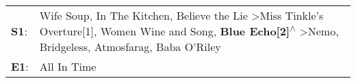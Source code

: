 \begin{supertabular}{p{0.03\textwidth}p{0.92\textwidth}}
 \textbf{S1}:  &  Wife Soup\textsuperscript{}, \enspace In The Kitchen\textsuperscript{}, \enspace Believe the Lie\textsuperscript{} \textgreater \enspace Miss Tinkle's Overture[1]\textsuperscript{}, \enspace Women Wine and Song\textsuperscript{}, \enspace \textbf{Blue Echo[2]\textsuperscript{$\wedge$}} \textgreater \enspace Nemo\textsuperscript{}, \enspace Bridgeless\textsuperscript{}, \enspace Atmosfarag\textsuperscript{}, \enspace Baba O'Riley\textsuperscript{}  \enspace  \\
 \textbf{E1}:  &                                                                                                                                                                                                                                                                                                                                                                                                                                       All In Time\textsuperscript{}  \enspace  \\
\end{supertabular}
